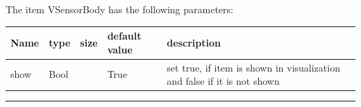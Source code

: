 The item VSensorBody has the following parameters:\vspace{-1cm}\\ 
\begin{center}
  \footnotesize
  \begin{longtable}{| p{4.5cm} | p{2.5cm} | p{0.5cm} | p{2.5cm} | p{6cm} |}
    \hline
    \bf Name & \bf type & \bf size & \bf default value & \bf description \\ \hline
    show &     Bool &      &     True &     set true, if item is shown in visualization and false if it is not shown\\ \hline
	  \end{longtable}
	\end{center}
\par\noindent\rule{\textwidth}{0.4pt}
\label{description_SensorBody}
